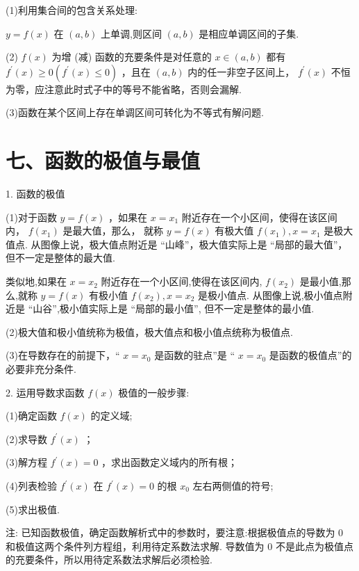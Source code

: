 (1)利用集合间的包含关系处理:

$y = f\left( x\right)$ 在 $\left( {a,b}\right)$ 上单调,则区间 $\left( {a,b}\right)$ 是相应单调区间的子集.

(2) $f\left( x\right)$ 为增 (减) 函数的充要条件是对任意的 $x \in  \left( {a,b}\right)$ 都有 ${f}^{\prime }\left( x\right)  \geq  0\left( {{f}^{\prime }\left( x\right)  \leq  0}\right)$ ，且在 $\left( {a,b}\right)$ 内的任一非空子区间上， ${f}^{\prime }\left( x\right)$ 不恒为零，应注意此时式子中的等号不能省略，否则会漏解.

(3)函数在某个区间上存在单调区间可转化为不等式有解问题.

\section*{七、函数的极值与最值}

1. 函数的极值

(1)对于函数 $y = f\left( x\right)$ ，如果在 $x = {x}_{1}$ 附近存在一个小区间，使得在该区间内， $f\left( {x}_{1}\right)$ 是最大值，那么， 就称 $y = f\left( x\right)$ 有极大值 $f\left( {x}_{1}\right) ,x = {x}_{1}$ 是极大值点. 从图像上说，极大值点附近是 “山峰”，极大值实际上是 “局部的最大值”，但不一定是整体的最大值.

类似地,如果在 $x = {x}_{2}$ 附近存在一个小区间,使得在该区间内, $f\left( {x}_{2}\right)$ 是最小值,那么,就称 $y = f\left( x\right)$ 有极小值 $f\left( {x}_{2}\right) ,x = {x}_{2}$ 是极小值点. 从图像上说,极小值点附近是 “山谷”,极小值实际上是 “局部的最小值”, 但不一定是整体的最小值.

(2)极大值和极小值统称为极值，极大值点和极小值点统称为极值点.

(3)在导数存在的前提下，“ $x = {x}_{0}$ 是函数的驻点”是 “ $x = {x}_{0}$ 是函数的极值点”的必要非充分条件.

2. 运用导数求函数 $f\left( x\right)$ 极值的一般步骤:

(1)确定函数 $f\left( x\right)$ 的定义域;

(2)求导数 ${f}^{\prime }\left( x\right)$ ；

(3)解方程 ${f}^{\prime }\left( x\right)  = 0$ ，求出函数定义域内的所有根；

(4)列表检验 ${f}^{\prime }\left( x\right)$ 在 ${f}^{\prime }\left( x\right)  = 0$ 的根 ${x}_{0}$ 左右两侧值的符号;

(5)求出极值.

注:  已知函数极值，确定函数解析式中的参数时，要注意:根据极值点的导数为 0 和极值这两个条件列方程组，利用待定系数法求解.   导数值为 0 不是此点为极值点的充要条件，所以用待定系数法求解后必须检验.

